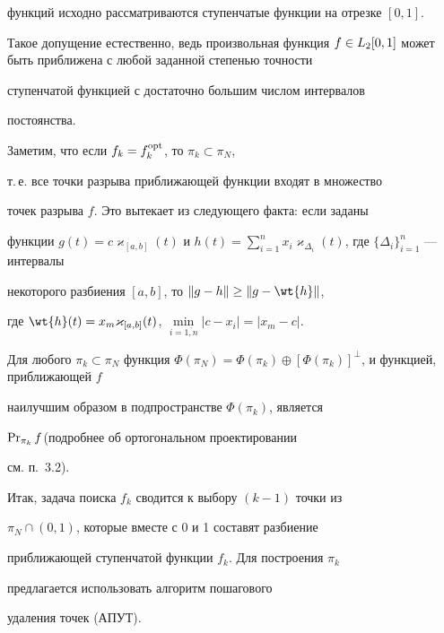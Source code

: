 функций исходно рассматриваются ступенчатые функции на отрезке $[0,1]$.


Такое допущение естественно, ведь произвольная функция $f\in


\Lotr$ может быть приближена с любой заданной степенью точности


ступенчатой функцией с достаточно большим числом интервалов


постоянства.





Заметим, что если $f_k=f_k^{\operatorname{opt}}$, то $\pi_k \subset \pi_N$,


т.\,е. все точки разрыва приближающей функции входят в множество


точек разрыва $f$. Это вытекает из следующего факта: если заданы


функции $g(t)=c \varkappa_{[a,b]}(t)$ и $h(t)=\sum\limits_{i=1}^n


x_i\varkappa_{\Delta_i}(t)$, где $\{\Delta_i\}_{i=1}^n$ --- интервалы


некоторого разбиения $[a,b]$, то $\|g-h\|\geq\|g-\wt{h}\|$,


где $\wt{h}(t)=x_{m}\varkappa_{[a,b]}(t)$, $\min\limits_{i=


\overline{1,n}}|c-x_i|=|x_m-c|$.





Для любого $\pi_k \subset \pi_N$ функция $\Phi( \pi_N )=\Phi( \pi_k


)\oplus [\Phi( \pi_k )]^\perp$, и функцией, приближающей $f$


наилучшим образом в подпространстве $\Phi(\pi_k)$, является


$\operatorname{Pr}_{\pi_k}f$(подробнее об ортогональном проектировании


см. п.~3.2).





Итак, задача поиска $f_k$ сводится к выбору $(k-1)$ точки из


$\pi_N\cap(0,1)$, которые вместе с 0 и 1 составят разбиение


приближающей ступенчатой функции $f_k$. Для построения $\pi_k$


предлагается использовать алгоритм пошагового


удаления точек (АПУТ).








